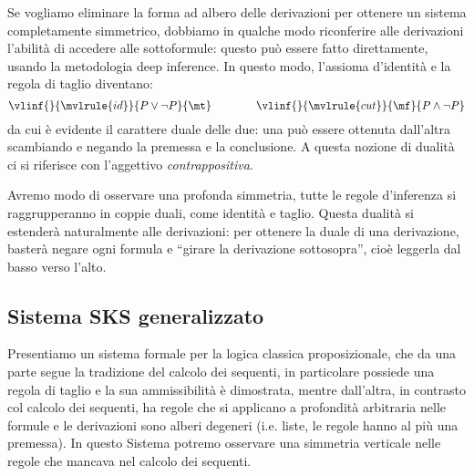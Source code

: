 \documentclass[12pt,a4paper,openright,twoside]{report}
\begin{document}
Se vogliamo eliminare la forma ad albero delle derivazioni per ottenere un sistema completamente simmetrico, dobbiamo in qualche modo riconferire alle derivazioni l'abilit\`a di accedere alle sottoformule: questo pu\`o essere fatto direttamente, usando la metodologia deep inference. In questo modo, l'assioma d'identit\`a e la regola di taglio diventano:
$$
	\vlinf{}{\mvlrule{id}}{P \vee \neg P}{\mt}
	\qquad\qquad
	\vlinf{}{\mvlrule{cut}}{\mf}{P \wedge \neg P}
$$
da cui \`e evidente il carattere duale delle due: una pu\`o essere ottenuta dall'altra scambiando e negando la premessa e la conclusione. A questa nozione di dualit\`a ci si riferisce con l'aggettivo \emph{contrappositiva}.

Avremo modo di osservare una profonda simmetria, tutte le regole d'inferenza si raggrupperanno in coppie duali, come identit\`a e taglio. Questa dualit\`a si estender\`a naturalmente alle derivazioni: per ottenere la duale di una derivazione, baster\`a negare ogni formula e ``girare la derivazione sottosopra'', cio\`e leggerla dal basso verso l'alto.


\subsection{Sistema SKS generalizzato} 
Presentiamo un sistema formale per la logica classica proposizionale, che da una parte segue la tradizione del calcolo dei sequenti, in particolare possiede una regola di taglio e la sua ammissibilit\`a \`e dimostrata, mentre dall'altra, in contrasto col calcolo dei sequenti, ha regole che si applicano a profondit\`a arbitraria nelle formule e le derivazioni sono alberi degeneri (i.e. liste, le regole hanno al pi\`u una premessa). In questo Sistema potremo osservare una simmetria verticale nelle regole che mancava nel calcolo dei sequenti.
\end{document}
